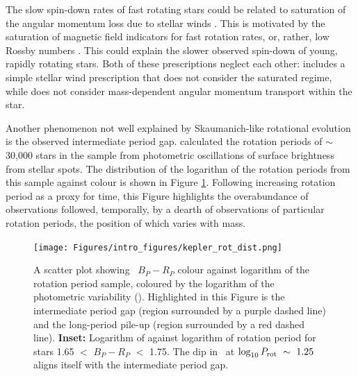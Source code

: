 The slow spin-down rates of fast rotating stars could  be related to saturation of the angular momentum loss due to stellar winds \citep{johnstone_stellar_2015, johnstone_stellar_2015-1,gallet_improved_2013}.
This is motivated by the saturation of magnetic field indicators for fast rotation rates, or, rather, low Rossby numbers \citep{wright_stellar-activity-rotation_2011}.
This could explain the slower observed spin-down of young, rapidly rotating stars.
Both of these prescriptions neglect each other: \citet{spada_competing_2020} includes a simple stellar wind prescription that does not consider the saturated regime, while \citet{gallet_improved_2013} does not consider mass-dependent angular momentum transport within the star.

Another phenomenon not well explained by Skaumanich-like rotational evolution is the observed intermediate period gap.
\citet{mcquillan_rotation_2014} calculated the rotation periods of $\sim$30,000 stars in the \kepler{} sample from photometric oscillations of surface brightness from stellar spots.
The distribution of the logarithm of the rotation periods from this sample against colour is shown in Figure \ref{fig:kepler_rot_period}. 
Following increasing rotation period as a proxy for time, this Figure highlights the overabundance of observations followed, temporally, by a dearth of observations of particular rotation periods, the position of which varies with mass.

\begin{figure}[h]
    \texttt{[image: Figures/intro\_figures/kepler\_rot\_dist.png]}
    \caption[The rotation period distribution of the \citet{mcquillan_rotation_2014} sample highlighting the intermediate period gap and long-period pile-up.]{A scatter plot showing \GDRT \ $B_P-R_P$ colour against logarithm of the \kepler{} \citet{mcquillan_rotation_2014} rotation period sample, coloured by the logarithm of the photometric variability (\rper). Highlighted in this Figure is the intermediate period gap (region surrounded by a purple dashed line) and the long-period pile-up (region surrounded by a red dashed line). \textbf{Inset:} Logarithm of \rper{} against logarithm of rotation period for stars 1.65 $<$ $B_P - R_P$ $<$ 1.75.  The dip in \rper\ at $\log_{10} P_{\rm{rot}} \ \sim\ 1.25$ aligns itself with the intermediate period gap.
    }
    \label{fig:kepler_rot_period}
\end{figure}


